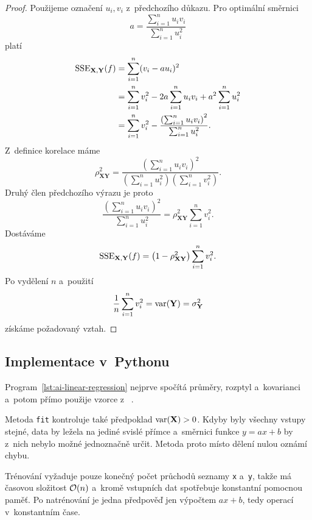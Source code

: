 \begin{proof}
    Použijeme označení \(u_i,v_i\) z~předchozího důkazu. Pro optimální směrnici
    \[
        a=
        \frac{\sum_{i=1}^{n}u_iv_i}
        {\sum_{i=1}^{n}u_i^2}
    \]
    platí
    \begin{align*}
        \operatorname{SSE}_{\mathbf{X},\mathbf{Y}}(f)
        &=
        \sum_{i=1}^{n}(v_i-au_i)^2\\
        &=
        \sum_{i=1}^{n}v_i^2
        -2a\sum_{i=1}^{n}u_iv_i
        +a^2\sum_{i=1}^{n}u_i^2\\
        &=
        \sum_{i=1}^{n}v_i^2
        -
        \frac{
            \left(\sum_{i=1}^{n}u_iv_i\right)^2
        }{
            \sum_{i=1}^{n}u_i^2
        }.
    \end{align*}
    Z~definice korelace máme
    \[
        \rho_{\mathbf{X}\mathbf{Y}}^2
        =
        \frac{
            \left(\sum_{i=1}^{n}u_iv_i\right)^2
        }{
            \left(\sum_{i=1}^{n}u_i^2\right)
            \left(\sum_{i=1}^{n}v_i^2\right)
        }.
    \]
    Druhý člen předchozího výrazu je proto
    \[
        \frac{
            \left(\sum_{i=1}^{n}u_iv_i\right)^2
        }{
            \sum_{i=1}^{n}u_i^2
        }
        =
        \rho_{\mathbf{X}\mathbf{Y}}^2
        \sum_{i=1}^{n}v_i^2.
    \]
    Dostáváme
    \[
        \operatorname{SSE}_{\mathbf{X},\mathbf{Y}}(f)
        =
        \left(1-\rho_{\mathbf{X}\mathbf{Y}}^2\right)
        \sum_{i=1}^{n}v_i^2.
    \]
    Po vydělení \(n\) a~použití
    \[
        \frac1n\sum_{i=1}^{n}v_i^2
        =
        \operatorname{var}(\mathbf{Y})
        =
        \sigma_{\mathbf{Y}}^2
    \]
    získáme požadovaný vztah.
\end{proof}

\subsection{Implementace v~Pythonu}

Program~\ref{lst:ai-linear-regression} nejprve spočítá průměry, rozptyl a~kovarianci a~potom přímo použije vzorce z~
.

Metoda \texttt{fit} kontroluje také předpoklad \(\operatorname{var}(\mathbf{X})>0\). Kdyby byly všechny vstupy stejné, data by ležela na jediné svislé přímce a~směrnici funkce \(y=ax+b\) by z~nich nebylo možné jednoznačně určit. Metoda proto místo dělení nulou oznámí chybu.



Trénování vyžaduje pouze konečný počet průchodů seznamy \texttt{x} a~\texttt{y}, takže má časovou složitost \(\mathcal{O}(n)\) a~kromě vstupních dat spotřebuje konstantní pomocnou paměť. Po natrénování je jedna předpověď jen výpočtem \(ax+b\), tedy operací v~konstantním čase.
